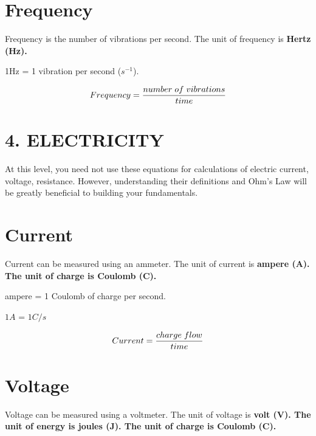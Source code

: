 \documentclass{report}
\begin{document}
\begin{flushleft}

\section*{Frequency}
\normalfont Frequency is the number of vibrations per second. The unit of frequency is \bf{Hertz (Hz)}.

\smallskip

\normalfont 1Hz = 1 vibration per second (${s^{-1}}$).

\begin{equation}
Frequency = \frac{number \hspace{1mm} of \hspace{1mm} vibrations}{time}
\end{equation}

\newpage

\section*{4. ELECTRICITY}
\normalfont At this level, you need not use these equations for calculations of electric current, voltage, resistance. However, understanding their definitions and Ohm's Law will be greatly beneficial to building your fundamentals. 

\section*{Current}
\normalfont Current can be measured using an ammeter. The unit of current is \bf{ampere (A)}. \normalfont The unit of charge is Coulomb (C). 

\medskip

 ampere = 1 Coulomb of charge per second. 

\smallskip $1A$ = $1C/s$

\begin{equation}
    Current = \frac{charge \hspace{1mm} flow}{time}
\end{equation}

\section*{Voltage}
\normalfont Voltage can be measured using a voltmeter. The unit of voltage is \bf{volt (V)}. \normalfont The unit of energy is joules (J). The unit of charge is Coulomb (C). 


\end{flushleft}
\end{document}
